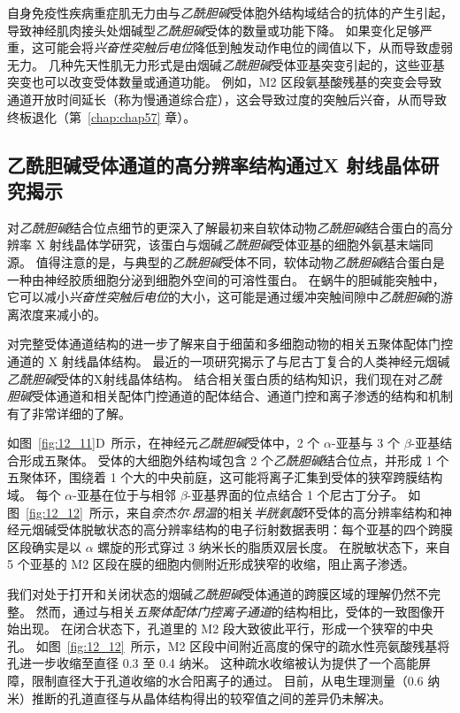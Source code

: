 自身免疫性疾病重症肌无力由与\textit{乙酰胆碱}受体胞外结构域结合的抗体的产生引起，导致神经肌肉接头处烟碱型\textit{乙酰胆碱}受体的数量或功能下降。
如果变化足够严重，这可能会将\textit{兴奋性突触后电位}降低到触发动作电位的阈值以下，从而导致虚弱无力。
几种先天性肌无力形式是由烟碱\textit{乙酰胆碱}受体亚基突变引起的，这些亚基突变也可以改变受体数量或通道功能。
例如，M2 区段氨基酸残基的突变会导致通道开放时间延长（称为慢通道综合症），这会导致过度的突触后兴奋，从而导致终板退化（第~\ref{chap:chap57} 章）。



\subsection{乙酰胆碱受体通道的高分辨率结构通过X 射线晶体研究揭示}

对\textit{乙酰胆碱}结合位点细节的更深入了解最初来自软体动物\textit{乙酰胆碱}结合蛋白的高分辨率 X 射线晶体学研究，该蛋白与烟碱\textit{乙酰胆碱}受体亚基的细胞外氨基末端同源。
值得注意的是，与典型的\textit{乙酰胆碱}受体不同，软体动物\textit{乙酰胆碱}结合蛋白是一种由神经胶质细胞分泌到细胞外空间的可溶性蛋白。
在蜗牛的胆碱能突触中，它可以减小\textit{兴奋性突触后电位}的大小，这可能是通过缓冲突触间隙中\textit{乙酰胆碱}的游离浓度来减小的。


对完整受体通道结构的进一步了解来自于细菌和多细胞动物的相关五聚体配体门控通道的 X 射线晶体结构。
最近的一项研究揭示了与尼古丁复合的人类神经元烟碱\textit{乙酰胆碱}受体的X射线晶体结构。
结合相关蛋白质的结构知识，我们现在对\textit{乙酰胆碱}受体通道和相关配体门控通道的配体结合、通道门控和离子渗透的结构和机制有了非常详细的了解。


如图~\ref{fig:12_11}D~所示，在神经元\textit{乙酰胆碱}受体中，2 个 $\alpha$-亚基与 3 个 $\beta$-亚基结合形成五聚体。
受体的大细胞外结构域包含 2 个\textit{乙酰胆碱}结合位点，并形成 1 个五聚体环，围绕着 1 个大的中央前庭，这可能将离子汇集到受体的狭窄跨膜结构域。
每个 $\alpha$-亚基在位于与相邻 $\beta$-亚基界面的位点结合 1 个尼古丁分子。
如图~\ref{fig:12_12}~所示，来自\textit{奈杰尔$\cdot$昂温}的相关\textit{半胱氨酸}环受体的高分辨率结构和神经元烟碱受体脱敏状态的高分辨率结构的电子衍射数据表明：每个亚基的四个跨膜区段确实是以 $\alpha$ 螺旋的形式穿过 3 纳米长的脂质双层长度。
在脱敏状态下，来自 5 个亚基的 M2 区段在膜的细胞内侧附近形成狭窄的收缩，阻止离子渗透。


我们对处于打开和关闭状态的烟碱\textit{乙酰胆碱}受体通道的跨膜区域的理解仍然不完整。
然而，通过与相关\textit{五聚体配体门控离子通道}的结构相比，受体的一致图像开始出现。
在闭合状态下，孔道里的 M2 段大致彼此平行，形成一个狭窄的中央孔。
如图~\ref{fig:12_12}~所示，M2 区段中间附近高度的保守的疏水性亮氨酸残基将孔进一步收缩至直径 0.3 至 0.4 纳米。
这种疏水收缩被认为提供了一个高能屏障，限制直径大于孔道收缩的水合阳离子的通过。
目前，从电生理测量（0.6 纳米）推断的孔道直径与从晶体结构得出的较窄值之间的差异仍未解决。


